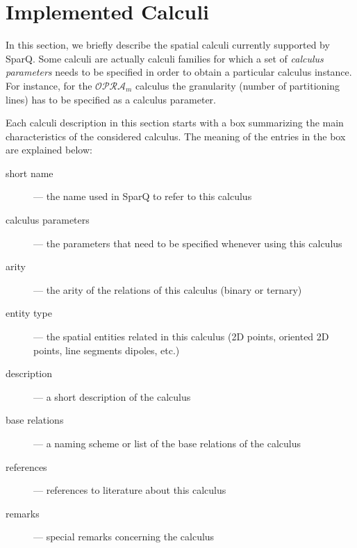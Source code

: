 \documentclass[headsepline]{scrreprt}
\theoremstyle{definition}
\newcommand{\engine}{SparQ}
\newcommand{\opra}{$\mathcal{OPRA}_m$}
\begin{document}



\appendix

\chapter{Implemented Calculi}\label{sec:supp-spat-calc}

In this section, we briefly describe the spatial calculi currently supported by \engine. Some calculi are actually calculi families for which a set of \emph{calculus parameters} needs to be specified in order to obtain a particular calculus instance. For instance, for the \opra{} calculus the granularity (number of partitioning lines) has to be specified as a calculus parameter.

Each calculi description in this section starts with a box summarizing the main characteristics of the considered calculus. The meaning of the entries in the box are explained below:

\begin{description}
\item[short name] --- the name used in \engine{} to refer to this calculus
\item[calculus parameters] --- the parameters that need to be specified whenever using this calculus
\item[arity] --- the arity of the relations of this calculus (binary or ternary)
\item[entity type] --- the spatial entities related in this calculus (2D points, oriented 2D points, line segments dipoles, etc.)
\item[description] --- a short description of the calculus
\item[base relations] --- a naming scheme or list of the base relations of the calculus
\item[references] --- references to literature about this calculus
\item[remarks] --- special remarks concerning the calculus
\end{description}

\end{document}
